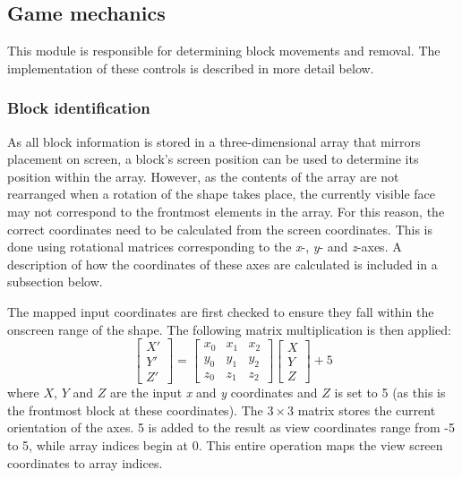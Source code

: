 \subsection{Game mechanics}
This module is responsible for determining block movements and removal. The implementation of these controls is described in more detail below.

\subsubsection{Block identification}
As all block information is stored in a three-dimensional array that mirrors placement on screen, a block's screen position can be used to determine its position within the array. However, as the contents of the array are not rearranged when a rotation of the shape takes place, the currently visible face may not correspond to the frontmost elements in the array. For this reason, the correct coordinates need to be calculated from the screen coordinates. This is done using rotational matrices corresponding to the \emph{x}-, \emph{y}- and \emph{z}-axes. A description of how the coordinates of these axes are calculated is included in a subsection below. 

The mapped input coordinates are first checked to ensure they fall within the onscreen range of the shape. The following matrix multiplication is then applied:
\begin{displaymath}
	\begin{bmatrix}
		X' \\ Y' \\ Z'
	\end{bmatrix} = 
	\begin{bmatrix}
		x_{0} & x_{1} & x_{2} \\
		y_{0} & y_{1} & y_{2} \\
		z_{0} & z_{1} & z_{2} 
	\end{bmatrix}
	\begin{bmatrix}
		X \\ Y \\ Z
	\end{bmatrix}
	+ 5
\end{displaymath}
where $X$, $Y$ and $Z$ are the input \emph{x} and \emph{y} coordinates and $Z$ is set to 5 (as this is the frontmost block at these coordinates). The $3 \times 3$ matrix stores the current orientation of the axes. 5 is added to the result as view coordinates range from -5 to 5, while array indices begin at 0. This entire operation maps the view screen coordinates to array indices.

